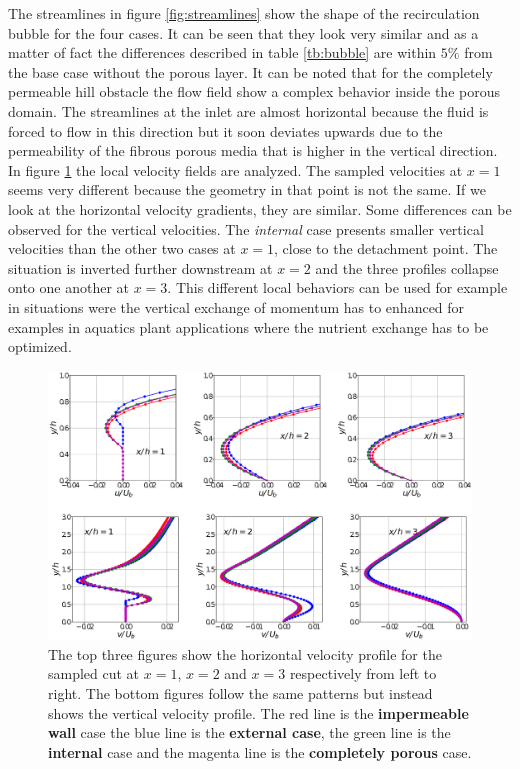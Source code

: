 The streamlines in figure \ref{fig:streamlines} show the shape of the recirculation bubble for the four cases. It can be seen that they look very similar and as a matter of fact the differences described in table \ref{tb:bubble} are within $5\%$ from the base case without the porous layer.
It can be noted that for the completely permeable hill obstacle the flow field show a complex behavior inside the porous domain. The streamlines at the inlet are almost horizontal because the fluid is forced to flow in this direction but it soon deviates upwards due to the permeability of the fibrous porous media that is higher in the vertical direction.
In figure \ref{fig:cuts_hill} the local velocity fields are analyzed. The sampled velocities at $x=1$ seems very different because the geometry in that point is not the same. If we look at the horizontal velocity gradients, they are similar. Some differences can be observed for the vertical velocities. The \textit{internal} case presents smaller vertical velocities than the other two cases at $x=1$, close to the detachment point. The situation is inverted further downstream at $x=2$ and the three profiles collapse onto one another at $x=3$. This different local behaviors can be used for example in situations were the vertical exchange of momentum has to enhanced for examples in aquatics plant applications where the nutrient exchange has to be optimized.

\begin{figure}[H]
	\centering
	\includegraphics[width=1\linewidth]{chapter_5/figure/cuts_hill}
	\caption{The top three figures show the horizontal velocity profile for the sampled cut at $x=1$, $x=2$ and $x=3$ respectively from left to right. The bottom figures follow the same patterns but instead shows the vertical velocity profile. The red line is the \textbf{impermeable wall} case the blue line is the \textbf{external case}, the green line is the \textbf{internal} case and the magenta line is the \textbf{completely porous} case.}
	\label{fig:cuts_hill}
\end{figure}


